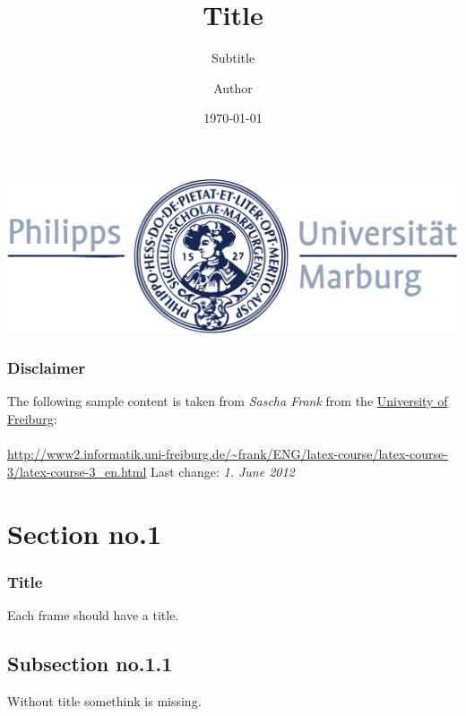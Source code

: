 \documentclass[11pt]{beamer}
\begin{document}
    \author{Author}
    \title{Title}
    \subtitle{Subtitle}
    \date{\today}
    \subject{Subject}
    \begin{frame}[plain]
        \begin{center}
        \hspace{1.5em}\includegraphics[width=.5\paperwidth]{gfx/logo_blue}
        \end{center}
        \vspace{-2em}
        \maketitle
    \end{frame}

    \begin{frame}
        \frametitle{Disclaimer}
        The following sample content is taken from \textit{Sascha Frank} from the \href{https://uni-freiburg.de/}{University of Freiburg}:\\~\\
        \url{http://www2.informatik.uni-freiburg.de/~frank/ENG/latex-course/latex-course-3/latex-course-3_en.html}
        Last change: \textit{1. June 2012}

    \end{frame}



    \section{Section no.1}
    \begin{frame}\frametitle{Title}
        Each frame should have a title.
    \end{frame}
    \subsection{Subsection no.1.1  }
    \begin{frame}
        Without title somethink is missing.
    \end{frame}
\end{document}
